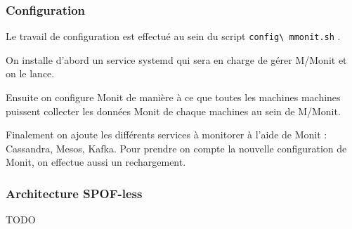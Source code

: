 \documentclass[a4paper, 11pt, titlepage]{article}
\begin{document}
\subsubsection {Configuration}

Le travail de configuration est effectué au sein du script \lstinline!config\ mmonit.sh! .

On installe d'abord un service systemd qui sera en charge de gérer M/Monit et on le lance.

Ensuite on configure Monit de manière à ce que toutes les machines machines puissent collecter les données Monit de chaque machines au sein de M/Monit.

Finalement on ajoute les différents services à monitorer à l'aide de Monit : Cassandra, Mesos, Kafka.
Pour prendre on compte la nouvelle configuration de Monit, on effectue aussi un rechargement.


\subsubsection {Architecture SPOF-less}

TODO
\end{document}

